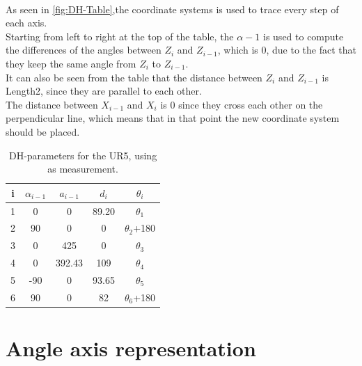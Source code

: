 \\
As seen in \ref{fig:DH-Table},the coordinate systems is used to trace every step of each axis.\\
Starting from left to right at the top of the table, the $\alpha-1$ is used to compute the differences of the angles between $Z_{i}$ and $Z_{i-1}$, which is 0, due to the fact that they keep the same angle from $Z_{i}$  to $Z_{i-1}$.\\
It can also be seen from the table that the distance between $Z_{i}$ and $Z_{i-1}$ is Length2, since they are parallel to each other.\\ 
The distance between $X_{i-1}$ and $X_i$ is 0 since they cross each other on the perpendicular line, which means that in that point the new coordinate system should be placed.\\

\begin{table}[h!]
\centering
\begin{tabular}{||c c c c c||} 
 \hline
 i & $\alpha_{i-1}$ & $a_{i-1}$ & $d_{i}$ & $\theta_{i}$ \\ [0.5ex] 
 \hline 
 \hline
 1 & 0 & 0 & 89.20 & $\theta_{1}$ \\ 
 2 & 90 & 0 & 0 & $\theta_{2}$+180 \\
 3 & 0 & 425 & 0 & $\theta_{3}$ \\
 4 & 0 & 392.43 & 109 & $\theta_{4}$ \\
 5 & -90 & 0 & 93.65 & $\theta_{5}$ \\ 
 6 & 90 & 0 & 82 & $\theta_{6}$+180\\[1ex] 
 \hline
\end{tabular}
\caption{DH-parameters for the UR5, using \cite{DHPar} as measurement.}
\label{table:1}
\end{table}

\section{Angle axis representation}

